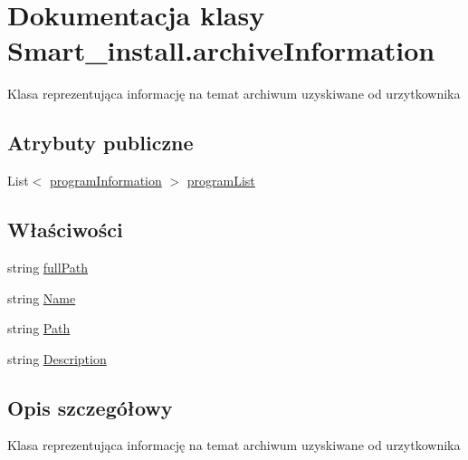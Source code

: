 \hypertarget{class_smart__install_1_1archive_information}{\section{Dokumentacja klasy Smart\+\_\+install.\+archive\+Information}
\label{class_smart__install_1_1archive_information}
}


Klasa reprezentująca informację na temat archiwum uzyskiwane od urzytkownika  


\subsection*{Atrybuty publiczne}
\begin{DoxyCompactItemize}
\item 
List$<$ \hyperlink{class_smart__install_1_1program_information}{program\+Information} $>$ \hyperlink{class_smart__install_1_1archive_information_aab785a5739f5bbf6f045d7ee81a5a19e}{program\+List}
\end{DoxyCompactItemize}
\subsection*{Właściwości}
\begin{DoxyCompactItemize}
\item 
string \hyperlink{class_smart__install_1_1archive_information_a19cf8082aecdf5cf77551b5831c650f6}{full\+Path}
\item 
string \hyperlink{class_smart__install_1_1archive_information_a30242e937fcc6f3b1290cd3b05a2d6d6}{Name}
\item 
string \hyperlink{class_smart__install_1_1archive_information_a794efeb3f46e5c0ec5eb101b1c17037d}{Path}
\item 
string \hyperlink{class_smart__install_1_1archive_information_a19ec6b73a8b2b58edca7eefb28839d0f}{Description}
\end{DoxyCompactItemize}


\subsection{Opis szczegółowy}
Klasa reprezentująca informację na temat archiwum uzyskiwane od urzytkownika 



